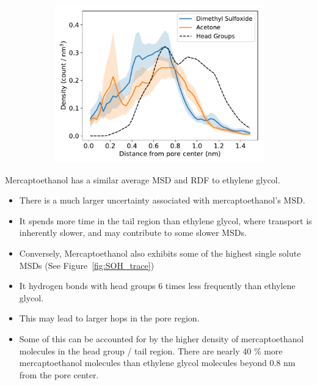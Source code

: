 \documentclass{article}
\begin{document}
\begin{figure}
\begin{subfigure}{0.325\linewidth}
  \includegraphics[width=\textwidth]{thiol_comparison_DMS.pdf}
  \caption{}\label{fig:DMP_GLY_comparison}
  \end{subfigure}
  \caption{}\label{fig:sulfur_analog_rdfs}
  \end{figure}
  
  \noindent Mercaptoethanol has a similar average MSD and RDF to ethylene glycol.
  \begin{itemize}
    \item There is a much larger uncertainty associated with mercaptoethanol's MSD.
    \item It spends more time in the tail region than ethylene glycol, where transport
    is inherently slower, and may contribute to some slower MSDs.  %
    \item Conversely, Mercaptoethanol also exhibits some of the highest single solute MSDs 
    (See Figure~\ref{fig:SOH_trace})  %
    \item It hydrogen bonds with head groups 6 times less frequently than ethylene glycol.
    \item This may lead to larger hops in the pore region.
    \item Some of this can be accounted for by the higher density of mercaptoethanol 
    molecules in the head group / tail region. There are nearly 40 \% more mercaptoethanol
    molecules than ethylene glycol molecules beyond 0.8 nm from the pore center. 
  \end{itemize}
  
\end{document}
